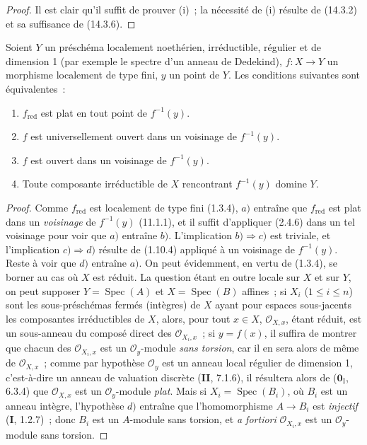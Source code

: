 \begin{proof}
Il est clair qu'il suffit de prouver (i)~; la nécessité de (i) résulte de (14.3.2)
et sa suffisance de (14.3.6).
\end{proof}

\begin{proposition}[14.3.8]
Soient $Y$ un préschéma localement noethérien, irréductible, régulier et de
dimension 1 (par exemple le spectre d'un anneau de Dedekind), $f:X\to Y$ un
morphisme localement de type fini, $y$ un point de $Y$. Les conditions suivantes
sont équivalentes~:
\begin{enumerate}[label=\emph{\alph*)}]
  \item $f_{\mathrm{red}}$ est plat en tout point de $f^{-1}(y)$.
  \item $f$ est universellement ouvert dans un voisinage de $f^{-1}(y)$.
  \item $f$ est ouvert dans un voisinage de $f^{-1}(y)$.
  \item Toute composante irréductible de $X$ rencontrant $f^{-1}(y)$ domine $Y$.
\end{enumerate}
\end{proposition}

\begin{proof}
Comme $f_{\mathrm{red}}$ est localement de type fini (1.3.4), $a)$ entraîne que
$f_{\mathrm{red}}$ est plat dans un \emph{voisinage} de $f^{-1}(y)$ (11.1.1), et il
suffit d'appliquer (2.4.6) dans un tel voisinage pour voir que $a)$ entraîne $b)$.
L'implication $b)\Rightarrow c)$ est triviale, et l'implication
$c)\Rightarrow d)$ résulte de (1.10.4) appliqué à un voisinage de $f^{-1}(y)$.
Reste à voir que $d)$ entraîne $a)$. On peut évidemment, en vertu de (1.3.4), se
borner au cas où $X$ est réduit. La question étant en outre locale sur $X$ et sur
$Y$, on peut supposer $Y=\operatorname{Spec}(A)$ et
$X=\operatorname{Spec}(B)$
affines~; si $X_i$ ($1\leq i\leq n$) sont les sous-préschémas fermés (intègres)
de $X$ ayant pour
espaces sous-jacents les composantes irréductibles de $X$,
alors, pour tout $x\in X$, $\mathcal O_{X,x}$, étant réduit, est un sous-anneau du
composé direct des $\mathcal O_{X_i,x}$~; si $y=f(x)$, il suffira de montrer que
chacun des $\mathcal O_{X_i,x}$ est un $\mathcal O_y$-module \emph{sans torsion},
car il en sera alors de même de $\mathcal O_{X,x}$~; comme par hypothèse
$\mathcal O_y$ est un anneau local régulier de dimension 1, c'est-à-dire un anneau
de valuation discrète (\textbf{II}, 7.1.6), il résultera alors de
($\mathbf{0}_{\mathrm I}$, 6.3.4) que $\mathcal O_{X,x}$ est un
$\mathcal O_y$-module \emph{plat}. Mais si $X_i=\operatorname{Spec}(B_i)$, où
$B_i$ est un anneau intègre, l'hypothèse $d)$ entraîne que l'homomorphisme
$A\to B_i$ est \emph{injectif} (\textbf{I}, 1.2.7)~; donc $B_i$ est un $A$-module sans
torsion, et \emph{a fortiori} $\mathcal O_{X_i,x}$ est un $\mathcal O_y$-module
sans torsion.
\end{proof}

